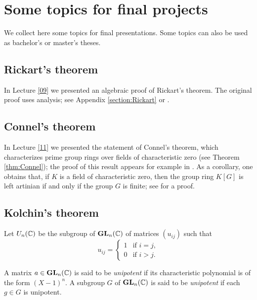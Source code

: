 \section{Some topics for final projects}

\pagestyle{plain}
\fancyhf{}
\fancyfoot[CE,CO]{\leftmark}
\fancyfoot[LE,RO]{\thepage}


We collect here some topics for final presentations. Some topics
can also be used as bachelor's or master's theses. 

\subsection*{Rickart's theorem}

In Lecture \ref{09} we presented an algebraic proof of Rickart's theorem. 
The original proof uses analysis; see Appendix \ref{section:Rickart} or \cite[(6.4) of Chapter II]{MR1838439}. 

\subsection*{Connel's theorem}

In Lecture \ref{11} we presented the statement of Connel's theorem, which
characterizes prime group rings over fields of characteristic zero 
(see Theorem \ref{thm:Connel}); the proof of this  
result appears for example in \cite[Theorem 2.10 of Chapter 4]{MR798076}. 
As a corollary, one obtains 
that, if $K$ is a field of characteristic zero,
then the group ring $K[G]$ is left artinian if and only if the group
$G$ is finite; see 
\cite[Theorem 1.1 of Chapter 10]{MR798076} for a proof. 

\subsection*{Kolchin's theorem}

Let $U_n(\mathbb{C})$ be the subgroup of $\mathbf{GL}_n(\mathbb{C})$ 
of matrices $(u_{ij})$ such that 
\[
u_{ij}=\begin{cases}
1&\text{if $i=j$},\\
0&\text{if $i>j$}.\end{cases}
\]

A matrix $a\in\mathbf{GL}_n(\mathbb{C})$ is said to be \emph{unipotent} 
if its characteristic polynomial is of the form $(X-1)^n$. 
A subgroup $G$ of $\mathbf{GL}_n(\mathbb{C})$ is said to be \emph{unipotent} if
each $g\in G$ is unipotent. 

